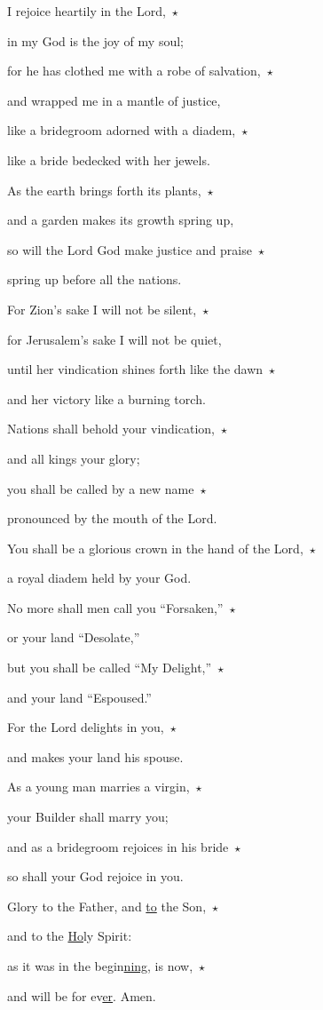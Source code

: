 \noindent I rejoice heartily in the Lord,~$\star$~\nopagebreak

in my God is the joy of my soul;

\noindent for he has clothed me with a robe of salvation,~$\star$~\nopagebreak

and wrapped me in a mantle of justice,

\noindent like a bridegroom adorned with a diadem,~$\star$~\nopagebreak

like a bride bedecked with her jewels.

\noindent As the earth brings forth its plants,~$\star$~\nopagebreak

and a garden makes its growth spring up,

\noindent so will the Lord God make justice and praise~$\star$~\nopagebreak

spring up before all the nations.

\noindent For Zion’s sake I will not be silent,~$\star$~\nopagebreak

for Jerusalem’s sake I will not be quiet,

\noindent until her vindication shines forth like the dawn~$\star$~\nopagebreak

and her victory like a burning torch.

\noindent Nations shall behold your vindication,~$\star$~\nopagebreak

and all kings your glory;

\noindent you shall be called by a new name~$\star$~\nopagebreak

pronounced by the mouth of the Lord.

\noindent You shall be a glorious crown in the hand of the Lord,~$\star$~\nopagebreak

a royal diadem held by your God.

\noindent No more shall men call you “Forsaken,”~$\star$~\nopagebreak

or your land “Desolate,”

\noindent but you shall be called “My Delight,”~$\star$~\nopagebreak

and your land “Espoused.”

\noindent For the Lord delights in you,~$\star$~\nopagebreak

and makes your land his spouse.

\noindent As a young man marries a virgin,~$\star$~\nopagebreak

your Builder shall marry you;

\noindent and as a bridegroom rejoices in his bride~$\star$~\nopagebreak

so shall your God rejoice in you.

\noindent Glory to the Father, and \uline{to} the Son,~$\star$~\nopagebreak

and to the \uline{Ho}ly Spirit:

\noindent as it was in the begin\uline{ning}, is now,~$\star$~\nopagebreak

and will be for ev\uline{er}. Amen.